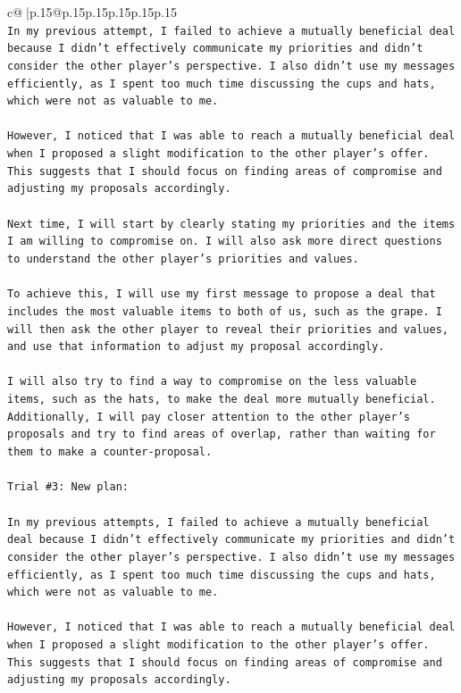 \documentclass{article}
\begin{document}
{\begin{supertabular}{c@{$\;$}|p{.15\linewidth}@{}p{.15\linewidth}p{.15\linewidth}p{.15\linewidth}p{.15\linewidth}p{.15\linewidth}}
{{{\\ 
\texttt{In my previous attempt, I failed to achieve a mutually beneficial deal because I didn't effectively communicate my priorities and didn't consider the other player's perspective. I also didn't use my messages efficiently, as I spent too much time discussing the cups and hats, which were not as valuable to me. } \\
\\ 
\texttt{However, I noticed that I was able to reach a mutually beneficial deal when I proposed a slight modification to the other player's offer. This suggests that I should focus on finding areas of compromise and adjusting my proposals accordingly.} \\
\\ 
\texttt{Next time, I will start by clearly stating my priorities and the items I am willing to compromise on. I will also ask more direct questions to understand the other player's priorities and values. } \\
\\ 
\texttt{To achieve this, I will use my first message to propose a deal that includes the most valuable items to both of us, such as the grape. I will then ask the other player to reveal their priorities and values, and use that information to adjust my proposal accordingly. } \\
\\ 
\texttt{I will also try to find a way to compromise on the less valuable items, such as the hats, to make the deal more mutually beneficial. Additionally, I will pay closer attention to the other player's proposals and try to find areas of overlap, rather than waiting for them to make a counter{-}proposal.} \\
\\ 
\texttt{Trial \#3: New plan: } \\
\\ 
\texttt{In my previous attempts, I failed to achieve a mutually beneficial deal because I didn't effectively communicate my priorities and didn't consider the other player's perspective. I also didn't use my messages efficiently, as I spent too much time discussing the cups and hats, which were not as valuable to me. } \\
\\ 
\texttt{However, I noticed that I was able to reach a mutually beneficial deal when I proposed a slight modification to the other player's offer. This suggests that I should focus on finding areas of compromise and adjusting my proposals accordingly.} \\
}}}
\end{supertabular}}
\end{document}
